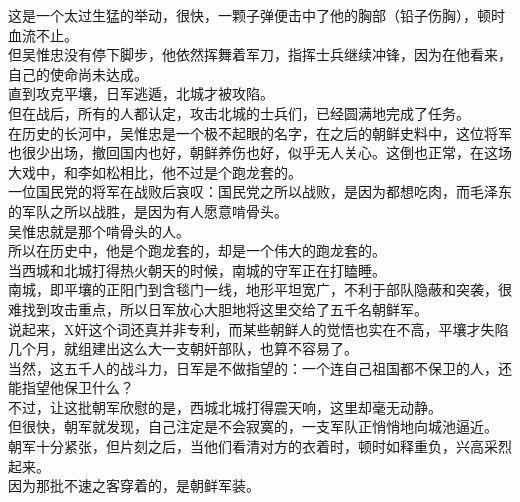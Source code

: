 \begin{multicols}{\theparacolNo}
这是一个太过生猛的举动，很快，一颗子弹便击中了他的胸部（铅子伤胸），顿时血流不止。\\

但吴惟忠没有停下脚步，他依然挥舞着军刀，指挥士兵继续冲锋，因为在他看来，自己的使命尚未达成。\\

直到攻克平壤，日军逃遁，北城才被攻陷。\\

但在战后，所有的人都认定，攻击北城的士兵们，已经圆满地完成了任务。\\

在历史的长河中，吴惟忠是一个极不起眼的名字，在之后的朝鲜史料中，这位将军也很少出场，撤回国内也好，朝鲜养伤也好，似乎无人关心。这倒也正常，在这场大戏中，和李如松相比，他不过是个跑龙套的。\\

一位国民党的将军在战败后哀叹：国民党之所以战败，是因为都想吃肉，而毛泽东的军队之所以战胜，是因为有人愿意啃骨头。\\

吴惟忠就是那个啃骨头的人。\\

所以在历史中，他是个跑龙套的，却是一个伟大的跑龙套的。\\

当西城和北城打得热火朝天的时候，南城的守军正在打瞌睡。\\

南城，即平壤的正阳门到含毯门一线，地形平坦宽广，不利于部队隐蔽和突袭，很难找到攻击重点，所以日军放心大胆地将这里交给了五千名朝鲜军。\\

说起来，X奸这个词还真并非专利，而某些朝鲜人的觉悟也实在不高，平壤才失陷几个月，就组建出这么大一支朝奸部队，也算不容易了。\\

当然，这五千人的战斗力，日军是不做指望的：一个连自己祖国都不保卫的人，还能指望他保卫什么？\\

不过，让这批朝军欣慰的是，西城北城打得震天响，这里却毫无动静。\\

但很快，朝军就发现，自己注定是不会寂寞的，一支军队正悄悄地向城池逼近。\\

朝军十分紧张，但片刻之后，当他们看清对方的衣着时，顿时如释重负，兴高采烈起来。\\

因为那批不速之客穿着的，是朝鲜军装。\\


\end{multicols}

